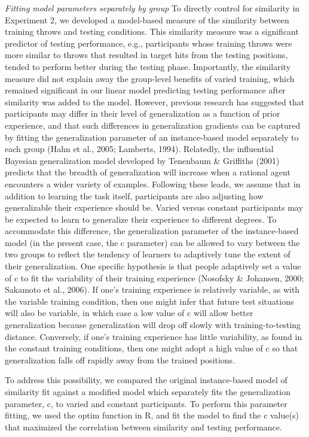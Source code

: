 \documentclass[
  man,floatsintext]{apa7}
\begin{document}
\emph{Fitting model parameters separately by group}
To directly control for similarity in Experiment 2, we developed a model-based measure of the similarity between training throws and testing conditions. This similarity measure was a significant predictor of testing performance, e.g., participants whose training throws were more similar to throws that resulted in target hits from the testing positions, tended to perform better during the testing phase. Importantly, the similarity measure did not explain away the group-level benefits of varied training, which remained significant in our linear model predicting testing performance after similarity was added to the model. However, previous research has suggested that participants may differ in their level of generalization as a function of prior experience, and that such differences in generalization gradients can be captured by fitting the generalization parameter of an instance-based model separately to each group (Hahn et al., 2005; Lamberts, 1994). Relatedly, the influential Bayesian generalization model developed by Tenenbaum \& Griffiths (2001) predicts that the breadth of generalization will increase when a rational agent encounters a wider variety of examples. Following these leads, we assume that in addition to learning the task itself, participants are also adjusting how generalizable their experience should be. Varied versus constant participants may be expected to learn to generalize their experience to different degrees. To accommodate this difference, the generalization parameter of the instance-based model (in the present case, the c parameter) can be allowed to vary between the two groups to reflect the tendency of learners to adaptively tune the extent of their generalization. One specific hypothesis is that people adaptively set a value of c to fit the variability of their training experience (Nosofsky \& Johansen, 2000; Sakamoto et al., 2006). If one's training experience is relatively variable, as with the variable training condition, then one might infer that future test situations will also be variable, in which case a low value of c will allow better generalization because generalization will drop off slowly with training-to-testing distance. Conversely, if one's training experience has little variability, as found in the constant training conditions, then one might adopt a high value of c so that generalization falls off rapidly away from the trained positions.

To address this possibility, we compared the original instance-based model of similarity fit against a modified model which separately fits the generalization parameter, c, to varied and constant participants. To perform this parameter fitting, we used the optim function in R, and fit the model to find the c value(s) that maximized the correlation between similarity and testing performance.
\end{document}
